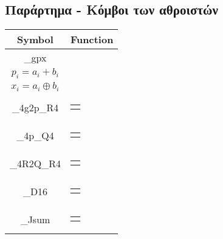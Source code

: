 \begin{appendices}




\section{Παράρτημα - Κόμβοι των αθροιστών}
\label{appendix:Node_modules}
\begin{table}[H]
\centering
    \begin{tabularx}{\textwidth}{ | c | X | } 

    \hline
    Symbol & Function\\
    \hline
    
    \_gpx &
    \begin{tabular}{@{}c@{}}
        $g_i = a_i * b_i$\\
        $p_i = a_i + b_i$\\
        $x_i = a_i \oplus b_i $
    \end{tabular}\\\hline
    
    \_4g2p\_R4 &
    \begin{tabular}{@{}c@{}}
        $R = g_3 + g_2 + p_1g_1 + p_1p_0g_0$
    \end{tabular}\\\hline
    
    \_4p\_Q4 &
    \begin{tabular}{@{}c@{}}
        $Q = p_3 p_2 p_1 p_0$
    \end{tabular}\\\hline
    
    \_4R2Q\_R4 &
    \begin{tabular}{@{}c@{}}
        $R = R_3 + R_2 + Q_1R_1 + Q_1Q_0R_0$
    \end{tabular}\\\hline
    
    \_D16 &
    \begin{tabular}{@{}c@{}}
        $D = p_1R + p_0Q$
    \end{tabular}\\\hline
    
    \_Jsum &
    \begin{tabular}{@{}c@{}}
        $sum = R\ ?\ x\oplus D\ :\ x$
    \end{tabular}\\\hline
    

\end{tabularx}
\end{table}
\end{appendices}
